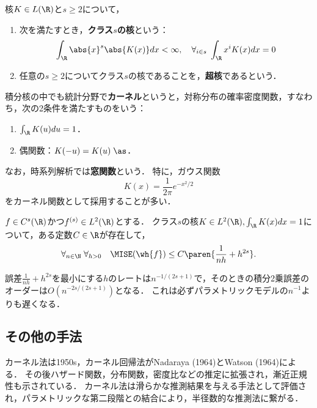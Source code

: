 \documentclass[uplatex,dvipdfmx]{jsreport}
\begin{document}
\begin{definition}
    核$K\in L(\R)$と$s\ge2$について，
    \begin{enumerate}
        \item 次を満たすとき，\textbf{クラス$s$の核}という：
        \[\int_\R\abs{x}^s\abs{K(x)}dx<\infty,\quad\forall_{i\in s}\;\int_\R x^iK(x)dx=0\]
        \item 任意の$s\ge2$についてクラス$s$の核であることを，\textbf{超核}であるという．
    \end{enumerate}
\end{definition}

\begin{remark}
    積分核の中でも統計分野で\textbf{カーネル}というと，対称分布の確率密度関数，すなわち，次の2条件を満たすものをいう：
    \begin{enumerate}
        \item $\int_\R K(u)du=1$．
        \item 偶関数：$K(-u)=K(u)\;\as$．
    \end{enumerate}
    なお，時系列解析では\textbf{窓関数}という．
    特に，ガウス関数
    \[K(x)=\frac{1}{2\pi}e^{-x^2/2}\]
    をカーネル関数として採用することが多い．
\end{remark}

\begin{theorem}
    $f\in C^s(\R)$かつ$f^{(s)}\in L^2(\R)$とする．
    クラス$s$の核$K\in L^2(\R),\int_\R K(x)dx=1$について，ある定数$C\in\R$が存在して，
    \[\forall_{n\in\N}\;\forall_{h>0}\quad\MISE(\wh{f})\le C\paren{\frac{1}{nh}+h^{2s}}.\]
\end{theorem}
\begin{remarks}
    誤差$\frac{1}{nh}+h^{2s}$を最小にする$h$のレートは$n^{-1/(2s+1)}$で，そのときの積分2乗誤差のオーダーは$O(n^{-2s/(2s+1)})$となる．
    これは必ずパラメトリックモデルの$n^{-1}$よりも遅くなる．
\end{remarks}

\subsection{その他の手法}

\begin{tcolorbox}[colframe=ForestGreen, colback=ForestGreen!10!white,breakable,colbacktitle=ForestGreen!40!white,coltitle=black,fonttitle=\bfseries\sffamily,
title=]
    カーネル法は1950s，カーネル回帰法がNadaraya (1964)とWatson (1964)による．
    その後ハザード関数，分布関数，密度比などの推定に拡張され，漸近正規性も示されている．
    カーネル法は滑らかな推測結果を与える手法として評価され，パラメトリックな第二段階との結合により，半径数的な推測法に繋がる．
\end{tcolorbox}
\end{document}
